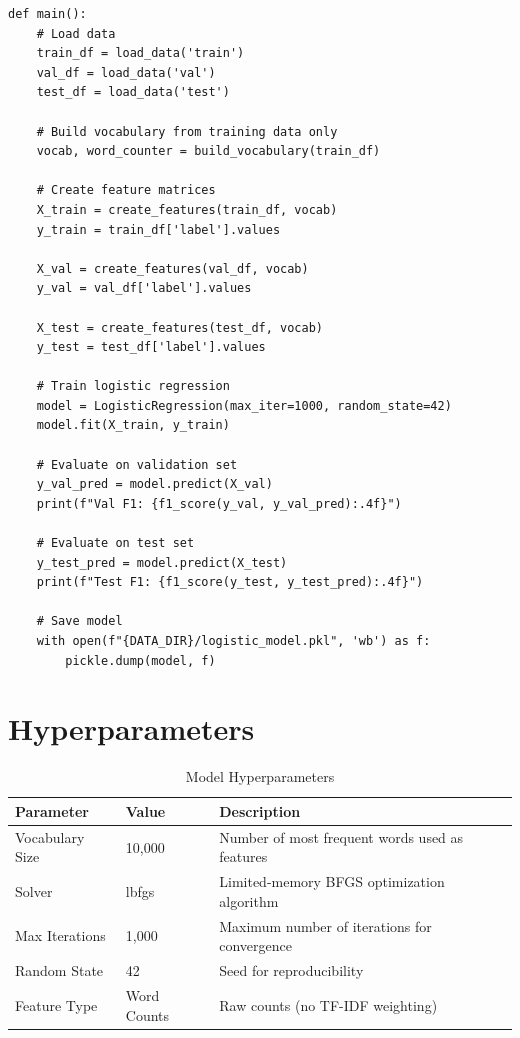 \documentclass[11pt,a4paper]{article}
\begin{document}
\begin{lstlisting}[style=pythonstyle, caption={Main Pipeline}]
def main():
    # Load data
    train_df = load_data('train')
    val_df = load_data('val')
    test_df = load_data('test')
    
    # Build vocabulary from training data only
    vocab, word_counter = build_vocabulary(train_df)
    
    # Create feature matrices
    X_train = create_features(train_df, vocab)
    y_train = train_df['label'].values
    
    X_val = create_features(val_df, vocab)
    y_val = val_df['label'].values
    
    X_test = create_features(test_df, vocab)
    y_test = test_df['label'].values
    
    # Train logistic regression
    model = LogisticRegression(max_iter=1000, random_state=42)
    model.fit(X_train, y_train)
    
    # Evaluate on validation set
    y_val_pred = model.predict(X_val)
    print(f"Val F1: {f1_score(y_val, y_val_pred):.4f}")
    
    # Evaluate on test set
    y_test_pred = model.predict(X_test)
    print(f"Test F1: {f1_score(y_test, y_test_pred):.4f}")
    
    # Save model
    with open(f"{DATA_DIR}/logistic_model.pkl", 'wb') as f:
        pickle.dump(model, f)
\end{lstlisting}

\section{Hyperparameters}

\begin{table}[h]
\centering
\begin{tabular}{|l|l|p{7cm}|}
\hline
\textbf{Parameter} & \textbf{Value} & \textbf{Description} \\
\hline
Vocabulary Size & 10,000 & Number of most frequent words used as features \\
\hline
Solver & lbfgs & Limited-memory BFGS optimization algorithm \\
\hline
Max Iterations & 1,000 & Maximum number of iterations for convergence \\
\hline
Random State & 42 & Seed for reproducibility \\
\hline
Feature Type & Word Counts & Raw counts (no TF-IDF weighting) \\
\hline
\end{tabular}
\caption{Model Hyperparameters}
\end{table}
\end{document}
